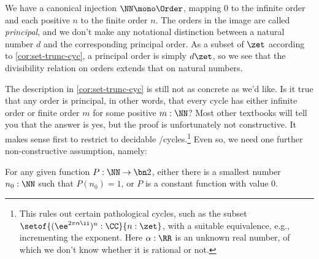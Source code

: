 We have a canonical injection $\NN \mono \Order$,
mapping $0$ to the infinite order and each positive $n$ to the finite order $n$.
The orders in the image are called \emph{principal},
and we don't make any notational distinction between a natural number $d$
and the corresponding principal order.
As a subset of $\zet$ according to \cref{cor:set-trunc-cyc}, 
a principal order is simply $d\zet$,
so we see that the divisibility relation on orders extends 
that on natural numbers.

The description in \cref{cor:set-trunc-cyc} is still not as concrete as we'd like.
Is it true that any order is principal, in other words,
that every cycle has either infinite order or finite order $m$
for some positive $m:\NN$?
Most other textbooks will tell you that the answer is yes,
but the proof is unfortunately not constructive.
It makes sense first to restrict to decidable \coverings/cycles.\footnote{%
  This rules out certain pathological cycles,
  such as the subset $\setof{(\ee^{2\pi\alpha\ii})^n:\CC}{n:\zet}$,
  with a suitable equivalence, e.g., incrementing the exponent.
  Here $\alpha:\RR$ is an unknown real number,
  of which we don't know whether it is rational or not.}
Even so, we need one further non-constructive assumption, namely:

\begin{principle}
  \label{LPO}%
  For any given function $P:\NN\to\bn 2$,
  either there is a smallest number $n_0:\NN$ such that $P(n_0)=1$,
  or $P$ is a constant function with value $0$.
\end{principle}


